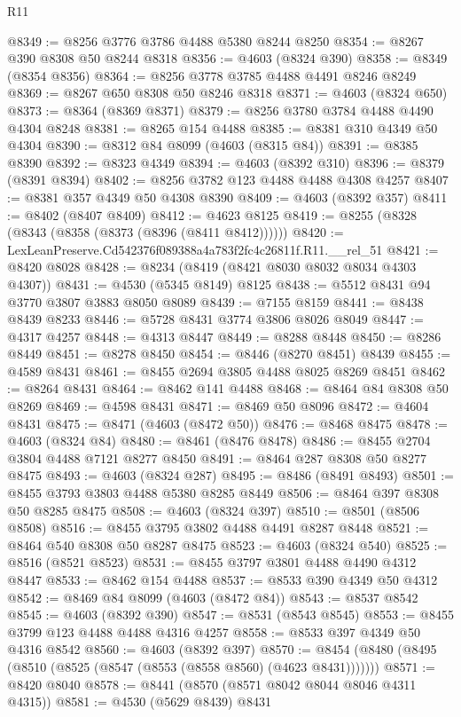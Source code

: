 \begin{lexlean}{R11}
\begin{coremodule}
@8349 := @8256 @3776 @3786 @4488 @5380 @8244 @8250
@8354 := @8267 @390 @8308 @50 @8244 @8318
@8356 := @4603 (@8324 @390)
@8358 := @8349 (@8354 @8356)
@8364 := @8256 @3778 @3785 @4488 @4491 @8246 @8249
@8369 := @8267 @650 @8308 @50 @8246 @8318
@8371 := @4603 (@8324 @650)
@8373 := @8364 (@8369 @8371)
@8379 := @8256 @3780 @3784 @4488 @4490 @4304 @8248
@8381 := @8265 @154 @4488
@8385 := @8381 @310 @4349 @50 @4304
@8390 := @8312 @84 @8099 (@4603 (@8315 @84))
@8391 := @8385 @8390
@8392 := @8323 @4349
@8394 := @4603 (@8392 @310)
@8396 := @8379 (@8391 @8394)
@8402 := @8256 @3782 @123 @4488 @4488 @4308 @4257
@8407 := @8381 @357 @4349 @50 @4308 @8390
@8409 := @4603 (@8392 @357)
@8411 := @8402 (@8407 @8409)
@8412 := @4623 @8125
@8419 := @8255 (@8328 (@8343 (@8358 (@8373 (@8396 (@8411 @8412))))))
@8420 := LexLeanPreserve.Cd542376f089388a4a783f2fc4c26811f.R11.__rel_51
@8421 := @8420 @8028
@8428 := @8234 (@8419 (@8421 @8030 @8032 @8034 @4303 @4307))
@8431 := @4530 (@5345 @8149) @8125
@8438 := @5512 @8431 @94 @3770 @3807 @3883 @8050 @8089
@8439 := @7155 @8159
@8441 := @8438 @8439 @8233
@8446 := @5728 @8431 @3774 @3806 @8026 @8049
@8447 := @4317 @4257
@8448 := @4313 @8447
@8449 := @8288 @8448
@8450 := @8286 @8449
@8451 := @8278 @8450
@8454 := @8446 (@8270 @8451) @8439
@8455 := @4589 @8431
@8461 := @8455 @2694 @3805 @4488 @8025 @8269 @8451
@8462 := @8264 @8431
@8464 := @8462 @141 @4488
@8468 := @8464 @84 @8308 @50 @8269
@8469 := @4598 @8431
@8471 := @8469 @50 @8096
@8472 := @4604 @8431
@8475 := @8471 (@4603 (@8472 @50))
@8476 := @8468 @8475
@8478 := @4603 (@8324 @84)
@8480 := @8461 (@8476 @8478)
@8486 := @8455 @2704 @3804 @4488 @7121 @8277 @8450
@8491 := @8464 @287 @8308 @50 @8277 @8475
@8493 := @4603 (@8324 @287)
@8495 := @8486 (@8491 @8493)
@8501 := @8455 @3793 @3803 @4488 @5380 @8285 @8449
@8506 := @8464 @397 @8308 @50 @8285 @8475
@8508 := @4603 (@8324 @397)
@8510 := @8501 (@8506 @8508)
@8516 := @8455 @3795 @3802 @4488 @4491 @8287 @8448
@8521 := @8464 @540 @8308 @50 @8287 @8475
@8523 := @4603 (@8324 @540)
@8525 := @8516 (@8521 @8523)
@8531 := @8455 @3797 @3801 @4488 @4490 @4312 @8447
@8533 := @8462 @154 @4488
@8537 := @8533 @390 @4349 @50 @4312
@8542 := @8469 @84 @8099 (@4603 (@8472 @84))
@8543 := @8537 @8542
@8545 := @4603 (@8392 @390)
@8547 := @8531 (@8543 @8545)
@8553 := @8455 @3799 @123 @4488 @4488 @4316 @4257
@8558 := @8533 @397 @4349 @50 @4316 @8542
@8560 := @4603 (@8392 @397)
@8570 := @8454 (@8480 (@8495 (@8510 (@8525 (@8547 (@8553 (@8558 @8560) (@4623 @8431)))))))
@8571 := @8420 @8040
@8578 := @8441 (@8570 (@8571 @8042 @8044 @8046 @4311 @4315))
@8581 := @4530 (@5629 @8439) @8431

\end{coremodule}
\end{lexlean}
